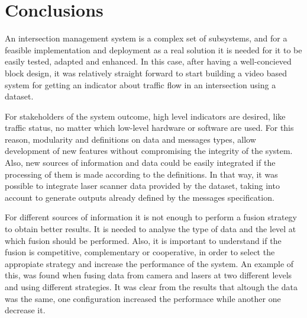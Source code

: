 \section{Conclusions}


An intersection management system is a complex set of subsystems, and for a feasible implementation and deployment as a real solution it is needed for it to be easily tested, adapted and enhanced. In this case, after having a well-concieved block design, it was relatively straight forward to start building a video based system for getting an indicator about traffic flow in an intersection using a dataset.

For stakeholders of the system outcome, high level indicators are desired, like traffic status, no matter which low-level hardware or software are used. For this reason, modularity and definitions on data and messages types, allow development of new features without compromising the integrity of the system. Also, new sources of information and data could be easily integrated if the processing of them is made according to the definitions. In that way, it was possible to integrate laser scanner data provided by the dataset, taking into account to generate outputs already defined by the messages specification.

For different sources of information it is not enough to perform a fusion strategy to obtain better results. It is needed to analyse the type of data and the level at which fusion should be performed. Also, it is important to understand if the fusion is competitive, complementary or cooperative, in order to select the appropiate strategy and increase the performance of the system. An example of this, was found when fusing data from camera and lasers at two different levels and using different strategies. It was clear from the results that altough the data was the same, one configuration increased the performace while another one decrease it.





